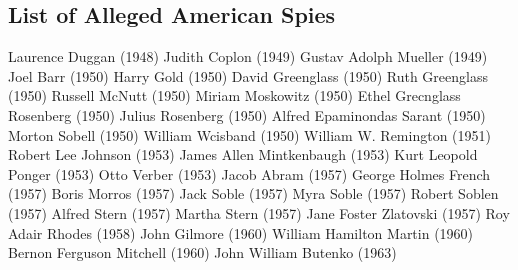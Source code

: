 \documentclass[12pt]{article}
\begin{document}
\subsection{List of Alleged American Spies}
\begin{multicols}{2}
\setlength{\parindent}{0ex}
Laurence Duggan (1948)\newline
Judith Coplon (1949)\newline
Gustav Adolph Mueller (1949)\newline
Joel Barr (1950)\newline
Harry Gold (1950)\newline
David Greenglass (1950)\newline
Ruth Greenglass (1950)\newline
Russell McNutt (1950)\newline
Miriam Moskowitz (1950)\newline
Ethel Grecnglass Rosenberg (1950)\newline
Julius Rosenberg (1950)\newline
Alfred Epaminondas Sarant (1950)\newline
Morton Sobell (1950)\newline
William Wcisband (1950)\newline
William W. Remington (1951)\newline
Robert Lee Johnson (1953)\newline
James Allen Mintkenbaugh (1953)\newline
Kurt Leopold Ponger (1953)\newline
Otto Verber (1953)\newline
Jacob Abram (1957)\newline
George Holmes French (1957)\newline
Boris Morros (1957)\newline
Jack Soble (1957)\newline
Myra Soble (1957)\newline
Robert Soblen (1957)\newline
Alfred Stern (1957)\newline
Martha Stern (1957)\newline
Jane Foster Zlatovski (1957)\newline
Roy Adair Rhodes (1958)\newline
John Gilmore (1960)\newline
William Hamilton Martin (1960)\newline
Bernon Ferguson Mitchell (1960)\newline
John William Butenko (1963)\newline

\end{multicols}
\end{document}
